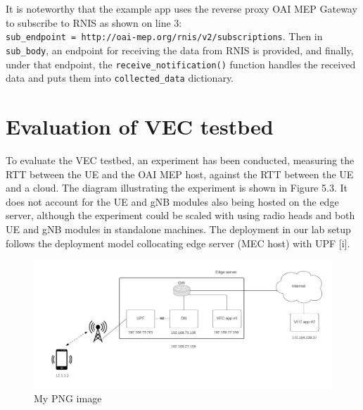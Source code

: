 \documentclass[12pt,a4paper,twoside]{report}
\begin{document}
It is noteworthy that the example app uses the reverse proxy OAI MEP Gateway to subscribe to RNIS as shown on line 3:  \\\verb |sub_endpoint = http://oai-mep.org/rnis/v2/subscriptions|. Then in \verb|sub_body|, an endpoint for receiving the data from RNIS is provided, and finally, under that endpoint, the \verb|receive_notification()| function handles the received data and puts them into \verb|collected_data| dictionary.


\section{Evaluation of VEC testbed}
To evaluate the VEC testbed, an experiment has been conducted, measuring the RTT between the UE and the OAI MEP host, against the RTT between the UE and a cloud. The diagram illustrating the experiment is shown in Figure 5.3. It does not account for the UE and gNB modules also being hosted on the edge server, although the experiment could be scaled with using radio heads and both UE and gNB modules in standalone machines. The deployment in our lab setup follows the deployment model collocating edge server (MEC host) with UPF [i].
\begin{figure}[!ht]
	\centering
	\includegraphics[width=\textwidth]{./images/experiment.png} 
	\caption{My PNG image}
\end{figure}
\end{document}
